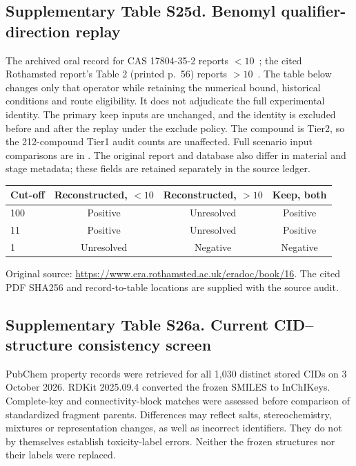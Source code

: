 
\subsection*{Supplementary Table S25d. Benomyl qualifier-direction replay}

The archived oral record for CAS 17804-35-2 reports $<10$~\ugbee;
the cited Rothamsted report's Table 2 (printed p.~56) reports $>10$~\ugbee.
The table below changes only that operator while retaining the numerical bound,
historical conditions and route eligibility. It does not adjudicate the full
experimental identity. The primary keep inputs are unchanged, and the identity
is excluded before and after the replay under the exclude policy. The compound
is Tier2, so the 212-compound Tier1 audit counts are unaffected. Full scenario
input comparisons are in .
The original report and database also differ in material and stage metadata;
these fields are retained separately in the source ledger.

\begin{center}
\small
\begin{tabular}{lccc}
\toprule
Cut-off & Reconstructed, $<10$ & Reconstructed, $>10$ & Keep, both \\
\midrule
100 & Positive & Unresolved & Positive \\
11 & Positive & Unresolved & Positive \\
1 & Unresolved & Negative & Negative \\
\bottomrule
\end{tabular}
\end{center}

Original source: \url{https://www.era.rothamsted.ac.uk/eradoc/book/16}. The cited PDF SHA256 and record-to-table locations are supplied with the source audit.


\subsection*{Supplementary Table S26a. Current CID--structure consistency screen}

PubChem property records were retrieved for all 1,030 distinct stored
CIDs on 3 October 2026. RDKit 2025.09.4 converted the frozen SMILES to InChIKeys.
Complete-key and connectivity-block matches were assessed before comparison of
standardized fragment parents. Differences may reflect salts, stereochemistry,
mixtures or representation changes, as well as incorrect identifiers. They do
not by themselves establish toxicity-label errors. Neither the frozen structures
nor their labels were replaced.

